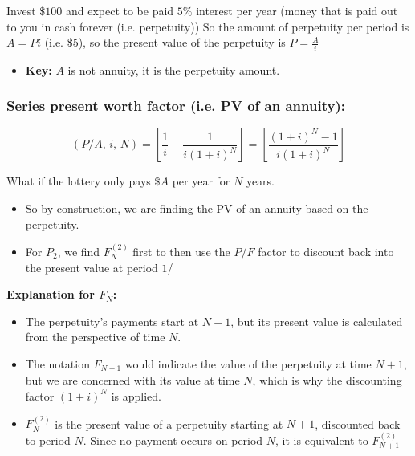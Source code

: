     \begin{derivation}
        Invest $\$100$ and expect to be paid $5\%$ interest per year (money that is paid out to you in cash forever (i.e. perpetuity))
        So the amount of perpetuity per period is $A=Pi$ (i.e. \$5), so the present value of the perpetuity is $P=\frac{A}{i}$
        \begin{itemize}
            \item \textbf{Key:} $A$ is not annuity, it is the perpetuity amount.
        \end{itemize}
    \end{derivation}

    \subsubsection{Series present worth factor (i.e. PV of an annuity):}
    \begin{definition}
        \begin{equation}
            \left(P/A, \, i, \, N\right) = \left[\frac{1}{i} - \frac{1}{i(1+i)^N}\right] = \left[\frac{(1+i)^N - 1}{i(1+i)^N}\right]
        \end{equation}
    \end{definition}

    \begin{derivation}
        What if the lottery only pays $\$A$ per year for $N$ years.
        \begin{itemize}
            \item So by construction, we are finding the PV of an annuity based on the perpetuity. 
            \item For $P_2$, we find $F_N^{(2)}$ first to then use the $P/F$ factor to discount back into the present value at period $1$/
        \end{itemize}
        \vspace{1em}

        \textbf{Explanation for $F_N$:}

        \begin{itemize}
            \item The perpetuity's payments start at \( N+1 \), but its present value is calculated from the perspective of time \( N \). 
                
            \item The notation \( F_{N+1} \) would indicate the value of the perpetuity at time \( N+1 \), but we are concerned with its value at time \( N \), which is why the discounting factor \( (1+i)^N \) is applied.
                
            \item \( F_N^{(2)} \) is the present value of a perpetuity starting at \( N+1 \), discounted back to period \( N \). Since no payment occurs on period $N$, it is equivalent to $F_{N+1}^{(2)}$
        \end{itemize}
    \end{derivation}

